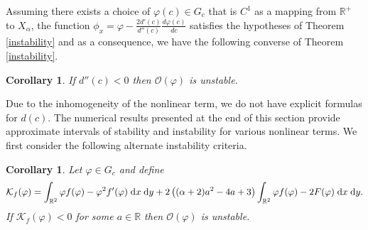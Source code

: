 \documentclass[10pt]{article}
\numberwithin{equation}{section}
\newtheorem{corollary}[theorem]{\quad Corollary}
\newcommand{\dd}{\;{\rm d}}
\newcommand{\ff}{\varphi}
\newcommand{\al}{\alpha}
\begin{document}
	\vskip 10pt
	Assuming there exists a choice of $\ff(c)\in G_c$ that is $C^1$ as a mapping from $\mathbb R^+$ to $X_\al$, the function $\phi_x=\ff-\frac{2d'(c)}{d''(c)}\frac{d\ff(c)}{dc}$ satisfies the hypotheses of Theorem \ref{instability} and as a consequence, we have the following converse of Theorem \ref{instability}. 
	\vskip 10pt
	\begin{corollary}\label{d''_instability} If $d''(c)<0$ then $\mathcal{O}(\ff)$ is unstable.
	\end{corollary}
	\vskip 10pt
	Due to the inhomogeneity of the nonlinear term, we do not have explicit formulas for $d(c)$. The numerical results presented at the end of this section provide approximate intervals of stability and instability for various nonlinear terms. We first consider the following alternate instability criteria. 
	
	
	\begin{corollary}\label{instability_criterion} Let $\ff\in G_c$ and define 
		\[
		\mathcal{K}_f(\ff)=\int_{\mathbb R^2}\ff f(\ff)-\ff^2f'(\ff)\dd x\dd y
		+2\left((\alpha+2)a^2-4a+3\right)\int_{\mathbb R^2}\ff f(\ff)-2F(\ff)\dd x\dd y.
		\]
		If $\mathcal{K}_f(\ff)<0$ for some $a\in\mathbb R$ then $\mathcal{O}(\ff)$ is unstable. 
	\end{corollary}
	
\end{document}
